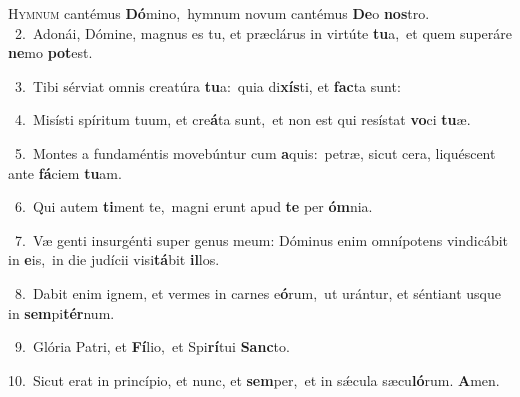 \lettrine{\initial\textcolor{\initialcolor}{H}}{ymnum} cantémus \textbf{Dó}\-mino,~\star hymnum novum cantémus \textbf{De}\-o \textbf{nos}\-tro.\\
{\numbfont\textcolor{\numbcolor}{~2.}}~Adonái, Dómine, magnus es tu, et præclárus in virtúte \textbf{tu}\-a,~\star et quem superáre \textbf{ne}\-mo \textbf{pot}\-est.\par
{\numbfont\textcolor{\numbcolor}{~3.}}~Tibi sérviat omnis creatúra \textbf{tu}\-a:~\star quia di\-\textbf{xís}\-ti, et \textbf{fac}\-ta sunt:\par
{\numbfont\textcolor{\numbcolor}{~4.}}~Misísti spíritum tuum, et cre\-\textbf{á}\-ta sunt,~\star et non est qui resístat \textbf{vo}\-ci \textbf{tu}\-æ.\par
{\numbfont\textcolor{\numbcolor}{~5.}}~Montes a fundaméntis movebúntur cum \textbf{a}\-quis:~\star petræ, sicut cera, liquéscent ante \textbf{fá}\-ciem \textbf{tu}\-am.\par
{\numbfont\textcolor{\numbcolor}{~6.}}~Qui autem \textbf{ti}\-ment te,~\star magni erunt apud \textbf{te} per \textbf{óm}\-nia.\par
{\numbfont\textcolor{\numbcolor}{~7.}}~Væ genti insurgénti super genus meum: Dóminus enim omnípotens vindicábit in \textbf{e}\-is,~\star in die judícii visi\-\textbf{tá}\-bit \textbf{il}\-los.\par
{\numbfont\textcolor{\numbcolor}{~8.}}~Dabit enim ignem, et vermes in carnes e\-\textbf{ó}\-rum,~\star ut urántur, et séntiant usque in \textbf{sem}\-pi\-\textbf{tér}\-num.\par
{\numbfont\textcolor{\numbcolor}{~9.}}~Glória Patri, et \textbf{Fí}\-lio,~\star et Spi\-\textbf{rí}\-tui \textbf{Sanc}\-to.\par
{\numbfont\textcolor{\numbcolor}{10.}}~Sicut erat in princípio, et nunc, et \textbf{sem}\-per,~\star et in sǽcula sæcu\-\textbf{ló}\-rum. \textbf{A}\-men.\par
